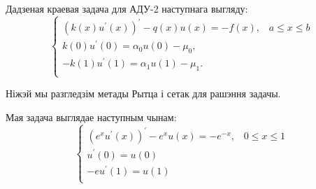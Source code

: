 Дадзеная краевая задача для АДУ-2 наступнага выгляду:
\begin{equation}
    \begin{cases}
        (k(x)u^{\prime}(x))^{\prime} - q(x)u(x) = -f(x), \hspace{10pt} a \leq x \leq b \\
        k(0)u^{\prime}(0) = \alpha_{0}u(0) - \mu_{0}, \\
        -k(1)u^{\prime}(1) = \alpha_{1}u(1) - \mu_{1}. \\
    \end{cases}
\end{equation}

Ніжэй мы разгледзім метады Рытца і сетак для рашэння задачы.

Мая задача выглядае наступным чынам:
\begin{equation}
    \begin{cases}
        (e^{x}u^{\prime}(x))^{\prime} - e^{x}u(x) = -e^{-x}, \hspace{10pt} 0 \leq x \leq 1 \\
        u^{\prime}(0) = u(0) \\
        -eu^{\prime}(1) = u(1) \\
    \end{cases}
\end{equation}
